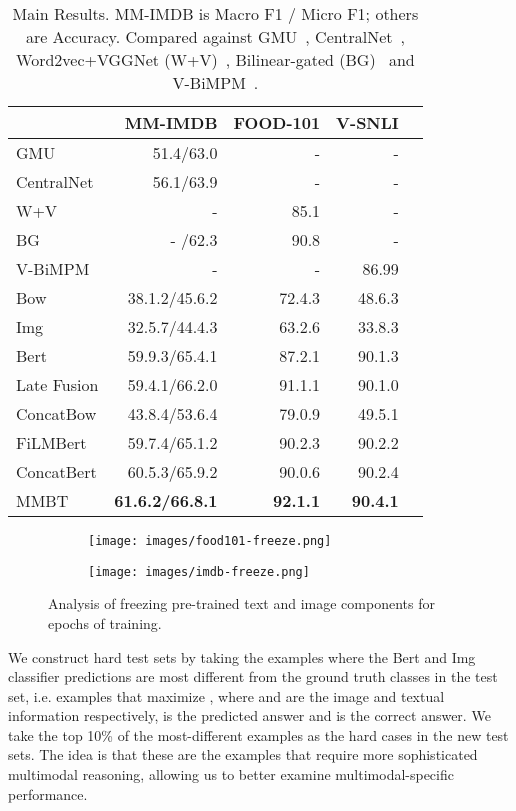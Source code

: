 \documentclass[11pt,a4paper]{article}
\begin{document}
\begin{table}[t]
    \centering\small
  \begin{tabular}{lrrrr}
    \toprule
    & MM-IMDB & FOOD-101 & V-SNLI \\\midrule
GMU & 51.4/63.0 & - & - \\
  	CentralNet & 56.1/63.9 & - & -\\
  	W+V & - & 85.1 & -\\
  	BG & - /62.3 & 90.8 & -\\
  	V-BiMPM & - & - & 86.99\\\midrule
  	Bow & 38.1.2/45.6.2 & 72.4.3 & 48.6.3\\
  	Img & 32.5.7/44.4.3 & 63.2.6 & 33.8.3\\
  	Bert & 59.9.3/65.4.1 & 87.2.1 & 90.1.3\\\midrule
  	Late Fusion & 59.4.1/66.2.0 & 91.1.1 & 90.1.0\\
  	ConcatBow & 43.8.4/53.6.4 & 79.0.9 & 49.5.1\\
  	FiLMBert & 59.7.4/65.1.2 & 90.2.3 & 90.2.2\\
  	ConcatBert & 60.5.3/65.9.2 & 90.0.6 & 90.2.4\\
  	MMBT & \textbf{61.6.2/66.8.1} & \textbf{92.1.1} & \textbf{90.4.1}\\
  	\bottomrule
  \end{tabular}
    \caption{Main Results. MM-IMDB is Macro F1 / Micro F1; others are Accuracy. Compared against GMU~\cite{Arevalo:2017mmimdb}, CentralNet~\cite{Vielzeuf:2018eccv}, Word2vec+VGGNet (W+V)~\cite{Wang:2015food101}, Bilinear-gated (BG)~\cite{Kiela:2018aaai} and V-BiMPM~\cite{Vu:2018vsnli}.}
    \label{tab:main}
\end{table}

\begin{figure*}[t]
    \centering
\begin{subfigure}{0.4\textwidth}
  \centering
  \texttt{[image: images/food101-freeze.png]}
\end{subfigure}\begin{subfigure}{0.4\textwidth}
  \centering
  \texttt{[image: images/imdb-freeze.png]}
\end{subfigure}
    \caption{\label{fig:freezing}Analysis of freezing pre-trained text and image components for  epochs of training.}
\end{figure*}

We construct hard test sets by taking the examples where the Bert and Img classifier predictions are most different from the ground truth classes in the test set, i.e. examples that maximize , where  and  are the image and textual information respectively,  is the predicted answer and  is the correct answer. We take the top 10\% of the most-different examples as the hard cases in the new test sets. The idea is that these are the examples that require more sophisticated multimodal reasoning, allowing us to better examine multimodal-specific performance.
\end{document}
